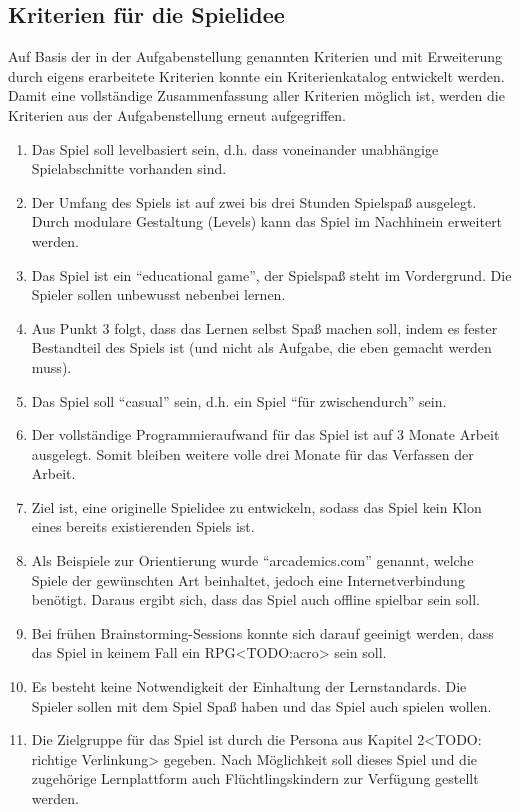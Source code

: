 \subsection{Kriterien für die Spielidee}\label{ssec:kriterien}
	Auf Basis der in der Aufgabenstellung genannten Kriterien und mit Erweiterung durch eigens erarbeitete Kriterien konnte ein Kriterienkatalog entwickelt werden. Damit eine vollständige Zusammenfassung aller Kriterien möglich ist, werden die Kriterien aus der Aufgabenstellung erneut aufgegriffen.
	\begin{enumerate}
		\item{Das Spiel soll levelbasiert sein, d.h. dass voneinander unabhängige Spielabschnitte vorhanden sind.}
		\item{Der Umfang des Spiels ist auf zwei bis drei Stunden Spielspaß ausgelegt. Durch modulare Gestaltung (Levels) kann das Spiel im Nachhinein erweitert werden.}
		\item{Das Spiel ist ein \enquote{educational game}, der Spielspaß steht im Vordergrund. Die Spieler sollen unbewusst nebenbei lernen.}
		\item{Aus Punkt 3 folgt, dass das Lernen selbst Spaß machen soll, indem es fester Bestandteil des Spiels ist (und nicht als Aufgabe, die eben gemacht werden muss).}
		\item{Das Spiel soll \enquote{casual} sein, d.h. ein Spiel \enquote{für zwischendurch} sein.}
		\item{Der vollständige Programmieraufwand für das Spiel ist auf 3 Monate Arbeit ausgelegt. Somit bleiben weitere volle drei Monate für das Verfassen der Arbeit.}
		\item{Ziel ist, eine originelle Spielidee zu entwickeln, sodass das Spiel kein Klon eines bereits existierenden Spiels ist.}
		\item{Als Beispiele zur Orientierung wurde \enquote{arcademics.com} genannt, welche Spiele der gewünschten Art beinhaltet, jedoch eine Internetverbindung benötigt. Daraus ergibt sich, dass das Spiel auch offline spielbar sein soll.}
		\item{Bei frühen Brainstorming-Sessions konnte sich darauf geeinigt werden, dass das Spiel in keinem Fall ein RPG<TODO:acro> sein soll.}
		\item{Es besteht keine Notwendigkeit der Einhaltung der Lernstandards. Die Spieler sollen mit dem Spiel Spaß haben und das Spiel auch spielen wollen.}
		\item{Die Zielgruppe für das Spiel ist durch die Persona aus Kapitel 2<TODO: richtige Verlinkung> gegeben. Nach Möglichkeit soll dieses Spiel und die zugehörige Lernplattform auch Flüchtlingskindern zur Verfügung gestellt werden.}
	\end{enumerate}

